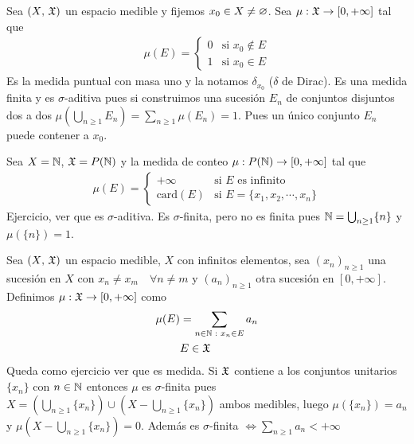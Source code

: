 \begin{eg}
    Sea $(X\text{, } \mathfrak{X})$ un espacio medible y fijemos $x_0 \in X \neq \varnothing$.
    Sea $\mu : \mathfrak{X} \to [0, +\infty]$ tal que \begin{align*}
        \mu(E) = \begin{cases}
                     0 & \text{si } x_0 \notin E \\
                     1 & \text{si } x_0 \in E
                 \end{cases}
    \end{align*}
    Es la medida puntual con masa uno y la notamos $\delta_{x_0}$ ($\delta$ de Dirac). Es una medida finita y es $\sigma$-aditiva pues si construimos
    una sucesión $E_n$ de conjuntos disjuntos dos a dos $\mu (\bigcup_{n \geq 1} E_n) = \sum_{n \geq 1} \mu(E_n) = 1$. Pues un único conjunto $E_n$ puede contener a $x_0$.
\end{eg}

\clearpage

\begin{eg}
    Sea $X = \mathbb{N}$, $\mathfrak{X} = P(\mathbb{N})$ y la medida de conteo $\mu : P(\mathbb{N}) \to [0, +\infty]$ tal que \begin{align*}
        \mu(E) = \begin{cases}
                     +\infty        & \text{si } E \text{ es infinito}           \\
                     \text{card}(E) & \text{si } E = \{ x_1, x_2, \cdots, x_n \}
                 \end{cases}
    \end{align*}
    Ejercicio, ver que es $\sigma$-aditiva. Es $\sigma$-finita, pero no es finita pues $\mathbb{N} = \bigcup_{n \geq 1} \{ n \}$ y $\mu(\{ n \}) = 1$.
\end{eg}

\begin{eg}
    Sea $(X\text{, } \mathfrak{X})$ un espacio medible, $X$ con infinitos elementos, sea $(x_n)_{n \geq 1}$ una sucesión en $X$ con $x_n \neq x_m \quad \forall n \neq m$ y
    $(a_n)_{n \geq 1}$ otra sucesión en $[0, +\infty]$. Definimos $\mu : \mathfrak{X} \to [0, +\infty]$ como \begin{align*}
        \mu(E) & = \sum_{n \in \mathbb{N} \text{ } : \text{ } x_n \in E} a_n \\
               & E \in \mathfrak{X}
    \end{align*}
    Queda como ejercicio ver que es medida.
    Si $\mathfrak{X}$ contiene a los conjuntos unitarios $\{ x_n \}$ con $n \in \mathbb{N}$ entonces $\mu$ es $\sigma$-finita pues $X = (\bigcup_{n \geq 1} \{ x_n \}) \cup (X - \bigcup_{n \geq 1} \{ x_n \})$ ambos medibles, luego
    $\mu(\{ x_n \}) = a_n$ y $\mu(X - \bigcup_{n \geq 1} \{ x_n \}) = 0$.
    Además es $\sigma$-finita $\iff \sum_{n \geq 1} a_n < +\infty$
\end{eg}

